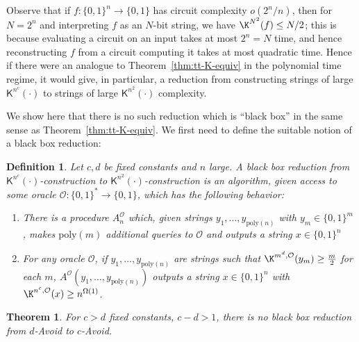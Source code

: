 \documentclass[11pt]{article}
\newtheorem{theorem}{Theorem}
\newtheorem{definition}{Definition}
\newcommand{\B}{\{0,1\}}
\renewcommand{\poly}{\mathrm{poly}}
\begin{document}
Observe that if $f: \B^n\to \B$ has circuit complexity $o(2^n/n)$, then for $N= 2^n$ and interpreting $f$ as an $N$-bit string, we have $\K^{N^2}(f) \leq N/2$; this is because evaluating a circuit on an input takes at most $2^n = N$ time, and hence reconstructing $f$ from a circuit computing it takes at most quadratic time. Hence if there were an analogue to Theorem~\ref{thm:tt-K-equiv} in the polynomial time regime, it would give, in particular, a reduction from constructing strings of large $\mathsf{K}^{n^c}(\cdot) $ to strings of large $\mathsf{K}^{n^2}(\cdot)$ complexity.

We show here that there is no such reduction which is ``black box'' in the same sense as Theorem~\ref{thm:tt-K-equiv}. We first need to define the suitable notion of a black box reduction:
\begin{definition}
Let $c,d$ be fixed constants and $n$ large. A black box reduction from $\mathsf{K}^{n^c}(\cdot) $-construction to $\mathsf{K}^{n^2}(\cdot)$-construction is an algorithm, given access to some oracle $\mathcal{O}: \B^* \to \B$, which has the following behavior:
\begin{enumerate}
    \item 
    There is a procedure $A^{\mathcal{O}}_n$ which, given strings $y_1,\ldots,y_{\poly(n)}$ with $y_m \in \B^m$, makes $\poly(m)$ additional queries to $\mathcal{O}$ and outputs a string $x \in \B^n$
    \item For any oracle $\mathcal{O}$, if $y_1,\ldots,y_{\poly(n)}$ are strings such that $\K^{m^d, \mathcal{O}}(y_m) \geq \frac{m}{2}$ for each $m$, $A^{\mathcal{O}}(y_1,\ldots,y_{\poly(n)})$ outputs a string $x \in \B^n$ with $\K^{n^c, \mathcal{O}}(x) \geq n^{\Omega(1)}$.
\end{enumerate}
\end{definition}
\begin{theorem}
For $c>d$ fixed constants, $c-d> 1$, there is no black box reduction from $d$-Avoid to $c$-Avoid.
\end{theorem}
\end{document}
